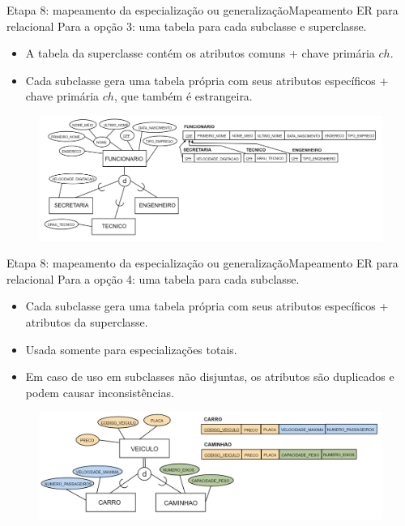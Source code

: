 \documentclass[t]{beamer}
\begin{document}

\begin{ftst}{Etapa 8: mapeamento da especialização ou generalização}{Mapeamento ER para relacional}
\small
Para a opção 3: uma tabela para cada subclasse e superclasse.
\begin{itemize}
    \item A tabela da superclasse contém os atributos comuns + chave primária $ch$.
    \item Cada subclasse gera uma tabela própria com seus atributos específicos + chave primária $ch$, que também é estrangeira. 
\end{itemize}
\begin{figure}
    \centering
    \includegraphics[scale=0.11]{Figuras/03_15.png}
\end{figure}
\end{ftst}


\begin{ftst}{Etapa 8: mapeamento da especialização ou generalização}{Mapeamento ER para relacional}
\small
Para a opção 4: uma tabela para cada subclasse.
\begin{itemize}
    \item Cada subclasse gera uma tabela própria com seus atributos específicos + atributos da superclasse.
    \item Usada somente para especializações totais.
    \item Em caso de uso em subclasses não disjuntas, os atributos são duplicados e podem causar inconsistências.
\end{itemize}
\begin{figure}
    \centering
    \includegraphics[scale=0.11]{Figuras/03_16.png}
\end{figure}
\end{ftst}
\end{document}
